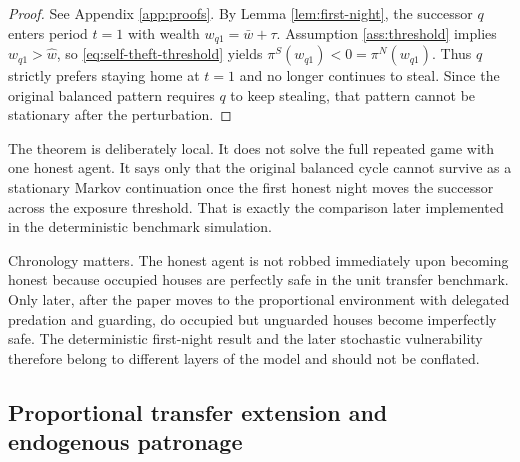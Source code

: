 \begin{proof}
See Appendix \ref{app:proofs}. By Lemma \ref{lem:first-night}, the successor $q$ enters period $t=1$ with wealth $w_{q1} = \bar{w} + \tau$. Assumption \ref{ass:threshold} implies $w_{q1} > \widehat{w}$, so \eqref{eq:self-theft-threshold} yields $\pi^{S}(w_{q1}) < 0 = \pi^{N}(w_{q1})$. Thus $q$ strictly prefers staying home at $t=1$ and no longer continues to steal. Since the original balanced pattern requires $q$ to keep stealing, that pattern cannot be stationary after the perturbation.
\end{proof}

The theorem is deliberately local. It does not solve the full repeated game with one honest agent. It says only that the original balanced cycle cannot survive as a stationary Markov continuation once the first honest night moves the successor across the exposure threshold. That is exactly the comparison later implemented in the deterministic benchmark simulation.

Chronology matters. The honest agent is not robbed immediately upon becoming honest because occupied houses are perfectly safe in the unit transfer benchmark. Only later, after the paper moves to the proportional environment with delegated predation and guarding, do occupied but unguarded houses become imperfectly safe. The deterministic first-night result and the later stochastic vulnerability therefore belong to different layers of the model and should not be conflated.

\subsection{Proportional transfer extension and endogenous patronage}

